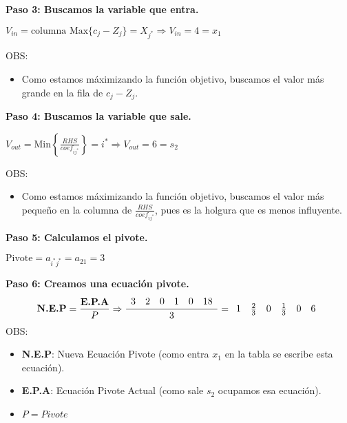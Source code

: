 \documentclass{templateNote}
\begin{document}
\textbf{Paso 3: Buscamos la variable que entra.}
\begin{center}
    $V_{in} = \text{columna Max} \{c_j-Z_j\} = X_{j^*} \Rightarrow V_{in} = 4 = x_1$
\end{center}
OBS:
\begin{itemize}
    \item Como estamos máximizando la función objetivo, buscamos el valor más grande en la fila de $c_j - Z_j$.
\end{itemize}

\textbf{Paso 4: Buscamos la variable que sale.}
\begin{center}
    $V_{out} = \text{Min} \left\{ \frac{RHS}{coef_{ij^*}} \right\} = i^* \Rightarrow V_{out} = 6 = s_2$
\end{center}
OBS:
\begin{itemize}
    \item Como estamos máximizando la función objetivo, buscamos el valor más pequeño en la columna de $\displaystyle\frac{RHS}{coef_{ij^*}}$, pues es la holgura que es menos influyente.
\end{itemize}

\textbf{Paso 5: Calculamos el pivote.}
\begin{center}
    $\text{Pivote} = a_{i^*j^*} = a_{21} = 3$
\end{center}

\textbf{Paso 6: Creamos una ecuación pivote.}
\begin{equation*}
    \textbf{N.E.P} = \frac{\textbf{E.P.A}}{P} \\
    \Rightarrow \frac{\begin{array}{cccccc} 3 & 2 & 0 & 1 & 0 & 18\end{array}}{3} = \begin{array}{cccccc} 1 & \frac{2}{3} & 0 & \frac{1}{3} & 0 & 6\end{array}
\end{equation*}
OBS:
\begin{itemize}
    \item \textbf{N.E.P}: Nueva Ecuación Pivote (como entra $x_1$ en la tabla se escribe esta ecuación).
    \item \textbf{E.P.A}: Ecuación Pivote Actual (como sale $s_2$ ocupamos esa ecuación).
    \item $P = Pivote$
\end{itemize}
\end{document}
